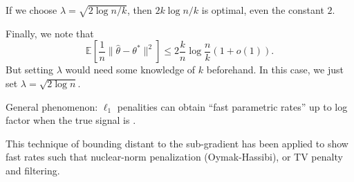 \begin{remark}
	If we choose \(\lambda = \sqrt{2 \log n / k} \), then \(2k \log n / k\) is optimal, even the constant \(2\).
\end{remark}

Finally, we note that
\[
	\mathbb{E}_{}\left[\frac{1}{n} \lVert \hat{\theta} - \theta ^{\ast} \rVert ^2 \right]
	\leq 2 \frac{k}{n} \log \frac{n}{k} (1 + o(1)).
\]
But setting \(\lambda \) would need some knowledge of \(k\) beforehand. In this case, we just set \(\lambda = \sqrt{2 \log n} \).

\begin{remark}
	General phenomenon: \(\ell _1\) penalities can obtain ``fast parametric rates'' up to log factor when the true signal is .
\end{remark}

\begin{remark}
	This technique of bounding distant to the sub-gradient has been applied to show fast rates such that nuclear-norm penalization (Oymak-Hassibi), or TV penalty and filtering.
\end{remark}